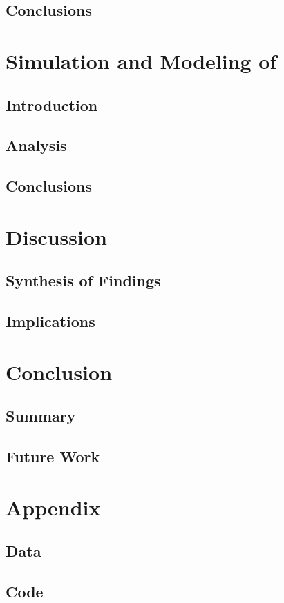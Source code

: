 \documentclass[a4paper, english]{article}
\begin{document}
    \subsection{Conclusions}

    \section{Simulation and Modeling of \texorpdfstring{}{Urban Heat Islands}}\label{sec:modelling}
    \subsection{Introduction}
    \subsection{Analysis}
    \subsection{Conclusions}

\section{Discussion}\label{sec:discussion}
    \subsection{Synthesis of Findings}
    \subsection{Implications}

\section{Conclusion}\label{sec:conclusion}

    \subsection{Summary}
    \subsection{Future Work}

\section{Appendix}
    \subsection{Data}
    \subsection{Code}


\newpage
\printbibliography
\end{document}
